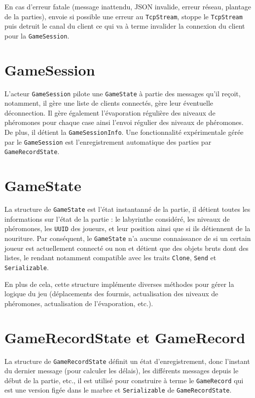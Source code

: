 \documentclass{EPUProjetDi}
\begin{document}
En cas d'erreur fatale (message inattendu, JSON invalide, erreur réseau, plantage de la parties), envoie si possible une erreur au \verb|TcpStream|, stoppe le \verb|TcpStream| puis detruit le canal du client ce qui va à terme invalider la connexion du client pour la \verb|GameSession|.

\section{GameSession}

L'acteur \verb|GameSession| pilote une \verb|GameState| à partie des messages qu'il reçoit, notamment, il gère une liste de clients connectés, gère leur éventuelle déconnection. Il gère également l'évaporation régulière des niveaux de phéromones pour chaque case ainsi l'envoi régulier des niveaux de phéromones.
De plus, il détient la \verb|GameSessionInfo|.
Une fonctionnalité expérimentale gérée par le \verb|GameSession| est l'enregistrement automatique des parties par \verb|GameRecordState|.

\section{GameState}

La structure de \verb|GameState| est l'état instantanné de la partie, il détient toutes les informations sur l'état de la partie : le labyrinthe considéré, les niveaux de phéromones, les \verb|UUID| des joueurs, et leur position ainsi que si ils détiennent de la nouriture.
Par conséquent, le \verb|GameState| n'a aucune connaissance de si un certain joueur est actuellement connecté ou non et détient que des objets bruts dont des listes, le rendant notamment compatible avec les traits \verb|Clone|, \verb|Send| et \verb|Serializable|.

En plus de cela, cette structure implémente diverses méthodes pour gérer la logique du jeu (déplacements des fourmis, actualisation des niveaux de phéromones, actualisation de l'évaporation, etc.).

\section{GameRecordState et GameRecord}

La structure de \verb|GameRecordState| définit un état d'enregistrement, donc l'instant du dernier message (pour calculer les délais), les différents messages depuis le début de la partie, etc., il est utilisé pour construire à terme le \verb|GameRecord| qui est une version figée dans le marbre et \verb|Serializable| de \verb|GameRecordState|.
\end{document}
